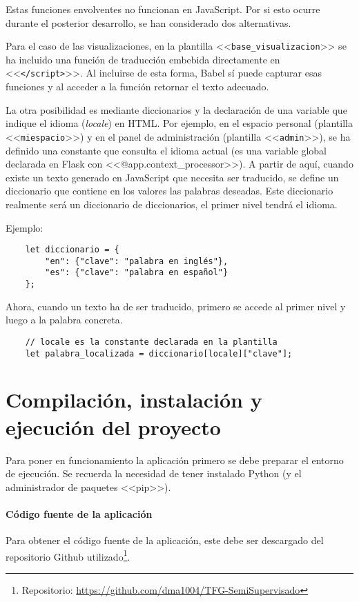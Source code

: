 Estas funciones envolventes no funcionan en JavaScript. Por si esto ocurre
durante el posterior desarrollo, se han considerado dos alternativas. 

Para el caso de las visualizaciones, en la plantilla
<<\texttt{base\_visualizacion}>> se ha incluido una función de traducción
embebida directamente en <<\texttt{</script>}>>. Al incluirse de esta forma,
Babel sí puede capturar esas funciones y al acceder a la función retornar el
texto adecuado. 

La otra posibilidad es mediante diccionarios y la declaración de una variable
que indique el idioma (\textit{locale}) en HTML. Por ejemplo, en el espacio
personal (plantilla <<\texttt{miespacio}>>) y en el panel de administración
(plantilla <<\texttt{admin}>>), se ha definido una constante que consulta el
idioma actual (es una variable global declarada en Flask con
<<@app.context\_processor>>). A partir de aquí, cuando existe un texto generado
en JavaScript que necesita ser traducido, se define un diccionario que contiene
en los valores las palabras deseadas. Este diccionario realmente será un
diccionario de diccionarios, el primer nivel tendrá el idioma.

Ejemplo:

\begin{verbatim}
    let diccionario = {
        "en": {"clave": "palabra en inglés"},
        "es": {"clave": "palabra en español"}
    };
\end{verbatim}

Ahora, cuando un texto ha de ser traducido, primero se accede al primer nivel y
luego a la palabra concreta.


\begin{verbatim}
    // locale es la constante declarada en la plantilla
    let palabra_localizada = diccionario[locale]["clave"];
\end{verbatim}

\section{Compilación, instalación y ejecución del proyecto}

Para poner en funcionamiento la aplicación primero se debe preparar el entorno
de ejecución. Se recuerda la necesidad de tener instalado Python (y el
administrador de paquetes <<pip>>).

\paragraph{Código fuente de la aplicación} Para obtener el código fuente de la
aplicación, este debe ser descargado del repositorio Github utilizado\footnote{
Repositorio: \url{https://github.com/dma1004/TFG-SemiSupervisado}}.


